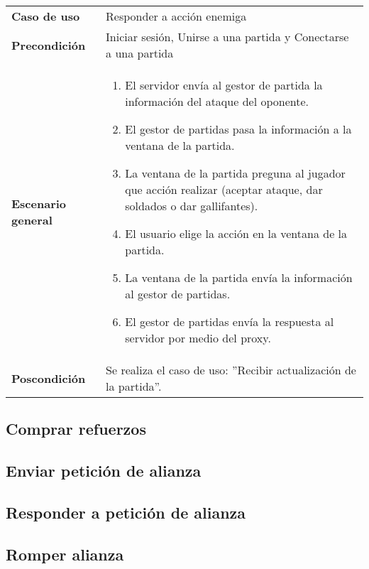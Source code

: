 {\footnotesize
\begin{tabularx}{0.95\textwidth}{p{}|X}

\textbf{Caso de uso} & Responder a acción enemiga \\

\textbf{Precondición} & Iniciar sesión, Unirse a una partida y Conectarse a una
partida \\

\textbf{Escenario general} & \begin{enumerate}
\item El servidor envía al gestor de partida la información del ataque del
oponente.
\item El gestor de partidas pasa la información a la ventana de la partida.
\item La ventana de la partida preguna al jugador que acción realizar (aceptar
ataque, dar soldados o dar gallifantes).
\item El usuario elige la acción en la ventana de la partida.
\item La ventana de la partida envía la información al gestor de partidas.
\item El gestor de partidas envía la respuesta al servidor por medio del proxy.

\end{enumerate} \\

\textbf{Poscondición} & Se realiza el caso de uso: ''Recibir actualización de la
partida''. \\

\end{tabularx}
}

\subsection{Comprar refuerzos}

\subsection{Enviar petición de alianza}

\subsection{Responder a petición de alianza}

\subsection{Romper alianza}

